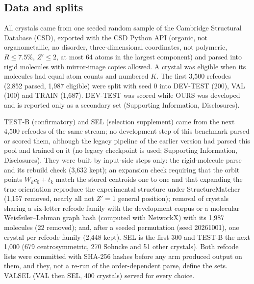 

\subsection{Data and splits}

All crystals came from one seeded random sample of the Cambridge Structural
Database (CSD)\cite{groom2016csd}, exported with the CSD Python API (organic, not
organometallic, no disorder, three-dimensional coordinates, not polymeric,
$R\le7.5\%$, $Z'\le2$, at most 64 atoms in the largest component) and parsed into
rigid molecules with mirror-image copies allowed. A crystal was eligible when its
molecules had equal atom counts and numbered $K$. The first 3,500 refcodes (2,852
parsed, 1,987 eligible) were split with seed 0 into DEV-TEST (200), VAL (100) and
TRAIN (1,687). DEV-TEST was scored while OURS was developed and is reported only as
a secondary set (Supporting Information, Disclosures).

TEST-B (confirmatory) and SEL (selection supplement) came from the next 4,500
refcodes of the same stream; no development step of this benchmark parsed or scored them,
although the legacy pipeline of the earlier version had parsed this pool and trained on it
(no legacy checkpoint is used; Supporting Information, Disclosures). They
were built by input-side steps only: the rigid-molecule parse and its rebuild check
(3,632 kept); an expansion check requiring that the orbit points $W_kc_0+t_k$ match
the stored centroids one to one and that expanding the true orientation reproduce
the experimental structure under StructureMatcher (1,157 removed, nearly all not
$Z'=1$ general position); removal of crystals sharing a six-letter refcode family
with the development corpus or a molecular Weisfeiler--Lehman graph
hash\cite{shervashidze2011wl} (computed with NetworkX\cite{hagberg2008networkx}) with its
1,987 molecules (22
removed); and, after a seeded permutation (seed 20261001), one crystal per refcode
family (2,448 kept). SEL is the first 300 and TEST-B the next 1,000 (679
centrosymmetric, 270 Sohncke and 51 other crystals). Both refcode lists were
committed with SHA-256 hashes before any arm produced output on them, and they,
not a re-run of the order-dependent parse, define the sets. VALSEL (VAL then SEL,
400 crystals) served for every choice.

